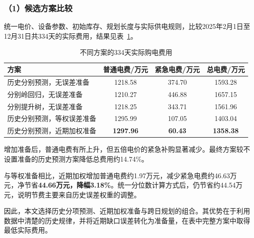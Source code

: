 \subsubsection*{（1）候选方案比较}
统一电价、设备参数、初始库存、规划长度与实际供电规则，比较2025年2月1日至12月31日共334天的实际费用，结果见表~\ref{tab:q2_model_compare}。
\begin{table}[htbp]
\centering
\caption{不同方案的334天实际购电费用}
\label{tab:q2_model_compare}
\begin{tabular}{lccc}
\hline
方案 & 普通电费/万元 & 紧急电费/万元 & 总电费/万元 \\
\hline
历史分别预测，无误差准备
& 1218.58 & 374.70 & 1593.28 \\
分别岭回归，无误差准备
& 1210.27 & 446.88 & 1657.15 \\
分别提升树，无误差准备
& 1218.25 & 343.71 & 1561.96 \\
历史分别预测，等权误差准备
& 1295.99 & 107.05 & 1403.04 \\
历史分别预测，近期加权准备
& \textbf{1297.96} & \textbf{60.43} & \textbf{1358.38} \\
\hline
\end{tabular}
\end{table}
增加准备后，普通电费有所上升，但五倍电价的紧急补购显著减少。最终方案较不设置准备的历史预测方案降低总费用约14.74\%。

与等权准备相比，近期加权增加普通电费约1.97万元，减少紧急电费约46.63万元，净节省\textbf{44.66万元，降幅3.18\%}。统一分位数计算方式后，仍节省约44.54万元，说明节费主要来自历史误差权重的调整。

因此，本文选择历史分项预测、近期加权准备与跨日规划的组合。其优势在于利用数据中清楚的历史规律，并将近期缺口误差转化为准备量，在表中完整方案中取得最低实际费用。

